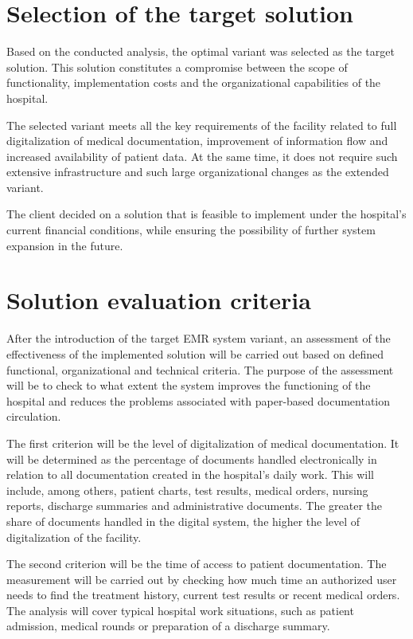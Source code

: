 \section{Selection of the target solution}

Based on the conducted analysis, the optimal variant was selected as the target solution. This solution constitutes a compromise between the scope of functionality, implementation costs and the organizational capabilities of the hospital.

The selected variant meets all the key requirements of the facility related to full digitalization of medical documentation, improvement of information flow and increased availability of patient data. At the same time, it does not require such extensive infrastructure and such large organizational changes as the extended variant.

The client decided on a solution that is feasible to implement under the hospital's current financial conditions, while ensuring the possibility of further system expansion in the future.
\section{Solution evaluation criteria}
After the introduction of the target EMR system variant, an assessment of the effectiveness of the implemented solution will be carried out based on defined functional, organizational and technical criteria. The purpose of the assessment will be to check to what extent the system improves the functioning of the hospital and reduces the problems associated with paper-based documentation circulation.

The first criterion will be the level of digitalization of medical documentation. It will be determined as the percentage of documents handled electronically in relation to all documentation created in the hospital's daily work. This will include, among others, patient charts, test results, medical orders, nursing reports, discharge summaries and administrative documents. The greater the share of documents handled in the digital system, the higher the level of digitalization of the facility.

The second criterion will be the time of access to patient documentation. The measurement will be carried out by checking how much time an authorized user needs to find the treatment history, current test results or recent medical orders. The analysis will cover typical hospital work situations, such as patient admission, medical rounds or preparation of a discharge summary.

